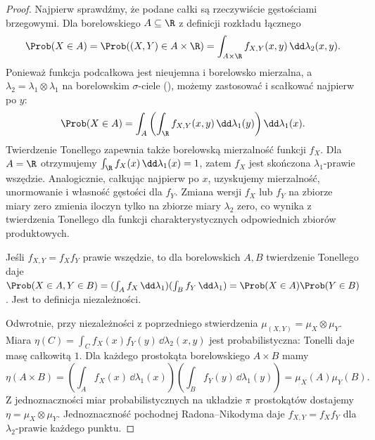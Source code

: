 \begin{proof}
Najpierw sprawdźmy, że podane całki są rzeczywiście
gęstościami brzegowymi. Dla borelowskiego $A\subseteq\R$
z definicji rozkładu łącznego
\[
\Prob(X\in A)=\Prob((X,Y)\in A\times\R)
=\int_{A\times\R}f_{X,Y}(x,y)\,\dd\lambda_2(x,y).
\]
Ponieważ funkcja podcałkowa jest nieujemna i borelowsko mierzalna,
a $\lambda_2=\lambda_1\otimes\lambda_1$ na borelowskim
$\sigma$-ciele (),
możemy zastosować 
i scałkować najpierw po $y$:
\[
\Prob(X\in A)=\int_A
\left(\int_\R f_{X,Y}(x,y)\,\dd\lambda_1(y)\right)
\dd\lambda_1(x).
\]
Twierdzenie Tonellego zapewnia także borelowską mierzalność
funkcji $f_X$. Dla $A=\R$ otrzymujemy
$\int_\R f_X(x)\,\dd\lambda_1(x)=1$, zatem $f_X$ jest
skończona $\lambda_1$-prawie wszędzie. Analogicznie, całkując
najpierw po $x$, uzyskujemy mierzalność, unormowanie i
własność gęstości dla $f_Y$.
Zmiana wersji $f_X$ lub $f_Y$ na zbiorze miary zero
zmienia iloczyn tylko na zbiorze miary $\lambda_2$ zero,
co wynika z twierdzenia Tonellego dla funkcji charakterystycznych
odpowiednich zbiorów produktowych.

Jeśli $f_{X,Y}=f_X f_Y$ prawie wszędzie, to dla
borelowskich $A,B$ twierdzenie Tonellego daje
$\Prob(X\in A,Y\in B)
=(\int_A f_X\,\dd\lambda_1)
 (\int_B f_Y\,\dd\lambda_1)
=\Prob(X\in A)\Prob(Y\in B)$.
Jest to definicja niezależności.

Odwrotnie, przy niezależności z poprzedniego stwierdzenia
$\mu_{(X,Y)}=\mu_X\otimes\mu_Y$.
Miara $\eta(C)=\int_C f_X(x)f_Y(y)\,\dd\lambda_2(x,y)$
jest probabilistyczna: Tonelli daje masę całkowitą $1$.
Dla każdego prostokąta borelowskiego $A\times B$ mamy
\[
\eta(A\times B)=
\left(\int_A f_X(x)\,\dd\lambda_1(x)\right)
\left(\int_B f_Y(y)\,\dd\lambda_1(y)\right)
=\mu_X(A)\mu_Y(B).
\]
Z jednoznaczności miar probabilistycznych na układzie $\pi$
prostokątów dostajemy $\eta=\mu_X\otimes\mu_Y$.
Jednoznaczność pochodnej Radona--Nikodyma daje
$f_{X,Y}=f_Xf_Y$ dla $\lambda_2$-prawie każdego punktu.
\end{proof}


